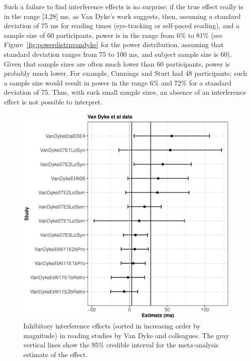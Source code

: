 \documentclass{cambridge7A}\usepackage[]{graphicx}\usepackage[]{color}
\makeatletter
\def\maxwidth{ %
  \ifdim\Gin@nat@width>\linewidth
    \linewidth
  \else
    \Gin@nat@width
  \fi
}
\newenvironment{knitrout}{}{} %
\makeatother
\begin{document}
Such a failure to find interference effects is no surprise; if the true effect really is in the range [3,28] ms, as Van Dyke's work suggests, then, assuming a standard deviation of 75 ms for reading times (eye-tracking or self-paced reading), and a sample size of 60 participants, power is in the range from 6\% to 81\% (see Figure~\ref{fig:powerdistrnvandyke} for the power distribution, assuming that standard deviation ranges from 75 to 100 ms, and subject sample size is 60). Given that sample sizes are often much lower than 60 participants, power is probably much lower. 
For example, Cunnings and Sturt had 48 participants; such a sample size would result in  power in the range 6\% and 72\% for a standard deviation of 75.
Thus, with such small sample sizes, an absence of an interference effect is not possible to interpret.

\begin{figure}[!htbp]
\centering
\begin{knitrout}
\color{fgcolor}

{\centering \includegraphics[width=\maxwidth]{figures/fig-jvddataplot-1} 

}



\end{knitrout}
\caption{Inhibitory interference effects (sorted in increasing order by magnitude) in reading studies by Van Dyke and colleagues. The gray vertical lines show the 95\%  credible interval for the meta-analysis estimate  of the effect.}\label{fig:jvddataplot}
\end{figure}
\end{document}
